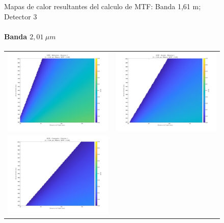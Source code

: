 \begin{landscape}
\begin{figure}[p]
\caption{Mapas de calor resultantes del calculo de MTF: Banda 1,61 \textmu m; Detector 3}
\end{figure}
\end{landscape}




\begin{landscape}
\begin{figure}[p]
\centering
\setlength{\tabcolsep}{2pt}
\renewcommand{\arraystretch}{0}
\paragraph{Banda $2,01\ \mu m$}
\begin{tabular}{cc}
\includegraphics[width=0.48\linewidth]{4.Payload/MTF/MTF_Lambda2_Detector1_Telescopio1_heatmap.jpg} &
\includegraphics[width=0.48\linewidth]{4.Payload/MTF/MTF_Lambda2_Detector1_Telescopio2_heatmap.jpg} \\
\includegraphics[width=0.48\linewidth]{4.Payload/MTF/MTF_Lambda2_Detector1_Telescopio3_heatmap.jpg} &

\end{tabular}
\end{figure}
\end{landscape}
